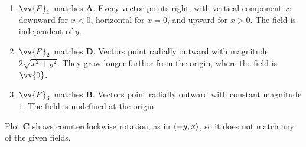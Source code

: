 \begin{example}
\begin{enumerate}
    \item $\vv{F}_1$ matches \textbf{A}. Every vector points right, with vertical component $x$: downward for $x < 0$, horizontal for $x = 0$, and upward for $x > 0$. The field is independent of $y$.
    \item $\vv{F}_2$ matches \textbf{D}. Vectors point radially outward with magnitude $2\sqrt{x^2 + y^2}$. They grow longer farther from the origin, where the field is $\vv{0}$.
    \item $\vv{F}_3$ matches \textbf{B}. Vectors point radially outward with constant magnitude $1$. The field is undefined at the origin.
\end{enumerate}
Plot \textbf{C} shows counterclockwise rotation, as in $\left\langle -y,x \right\rangle$, so it does not match any of the given fields.
\end{example}

